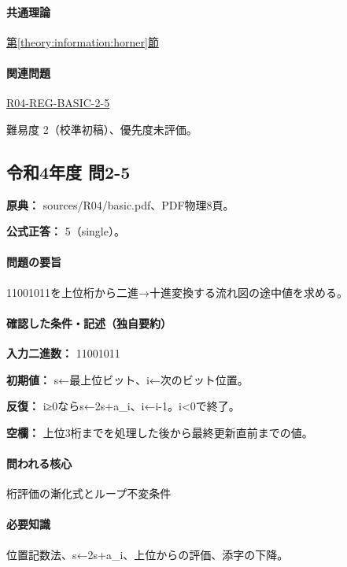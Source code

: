 \paragraph{共通理論} \hyperref[theory:information:horner]{第\ref*{theory:information:horner}節}

\paragraph{関連問題} \hyperref[q:r04-reg-basic-2-5]{R04-REG-BASIC-2-5}

\par 難易度 2（校準初稿）、優先度未評価。

\subsection{令和4年度 問2-5}
\label{q:r04-reg-basic-2-5}

\noindent\textbf{原典：} sources/R04/basic.pdf、PDF物理8頁。

\textbf{公式正答：} 5（single）。

\paragraph{問題の要旨} 11001011を上位桁から二進→十進変換する流れ図の途中値を求める。

\paragraph{確認した条件・記述（独自要約）}\mbox{}\par

\noindent\textbf{入力二進数：} 11001011\par

\noindent\textbf{初期値：} s←最上位ビット、i←次のビット位置。\par

\noindent\textbf{反復：} i≥0ならs←2s+a\_i、i←i-1。i<0で終了。\par

\noindent\textbf{空欄：} 上位3桁までを処理した後から最終更新直前までの値。\par

\paragraph{問われる核心} 桁評価の漸化式とループ不変条件

\paragraph{必要知識} 位置記数法、s←2s+a\_i、上位からの評価、添字の下降。

